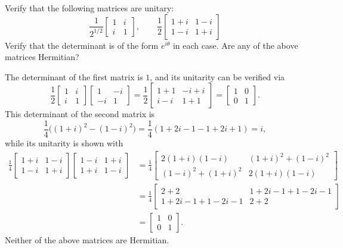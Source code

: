 \documentclass[../principles-of-quantum-mechanics.tex]{subfiles}
\begin{document}
\begin{questions}
\question Verify that the following matrices are unitary:
\[
\frac{1}{2^{1/2}}\begin{bmatrix}1 & i \\ i & 1\end{bmatrix}, \qquad \frac{1}{2}\begin{bmatrix}1 + i & 1 - i \\ 1 - i & 1 + i\end{bmatrix}
\]
Verify that the determinant is of the form $e^{i\theta}$ in each case. Are any of the above matrices Hermitian?

\begin{solution}
	The determinant of the first matrix is $1$, and its unitarity can be verified via
	\[
		\frac{1}{2}\begin{bmatrix}1 & i \\ i & 1\end{bmatrix}\begin{bmatrix}1 & -i \\ -i & 1\end{bmatrix} = \frac{1}{2}\begin{bmatrix}1 + 1 & -i + i \\ i - i & 1 + 1\end{bmatrix} = \begin{bmatrix}1 & 0 \\ 0 & 1\end{bmatrix}.
	\]
	This determinant of the second matrix is
	\[
		\frac{1}{4}\big((1+i)^2 - (1-i)^2\big) = \frac{1}{4}(1 + 2i -1 - 1 + 2i + 1) = i,
	\]
	while its unitarity is shown with
	\begin{align*}
		\frac{1}{4}\begin{bmatrix}1 + i & 1 - i \\ 1 - i & 1 + i\end{bmatrix}\begin{bmatrix}1 - i & 1 + i \\ 1 + i & 1 - i\end{bmatrix} &= \frac{1}{4}\begin{bmatrix}2(1+i)(1-i) & (1+i)^2 + (1-i)^2 \\ (1-i)^2 + (1+i)^2 & 2(1+i)(1-i)\end{bmatrix} \\
		&= \frac{1}{4}\begin{bmatrix}2 + 2 & 1 + 2i - 1 + 1 - 2i - 1 \\ 1 + 2i - 1 + 1 - 2i - 1 & 2 + 2\end{bmatrix} \\
		&= \begin{bmatrix}1 & 0 \\ 0 & 1\end{bmatrix}.
	\end{align*}
	Neither of the above matrices are Hermitian.
\end{solution}


\end{questions}
\end{document}
